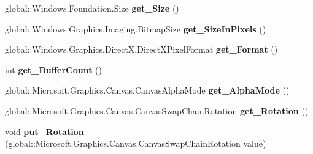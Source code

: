 \begin{DoxyCompactItemize}
global\+::\+Windows.\+Foundation.\+Size {\bfseries get\+\_\+\+Size} ()
\item 
\mbox{\label{interface_microsoft_1_1_graphics_1_1_canvas_1_1_i_canvas_swap_chain_a3d6681ade03b642ae899d612f2725a9a}} 
global\+::\+Windows.\+Graphics.\+Imaging.\+Bitmap\+Size {\bfseries get\+\_\+\+Size\+In\+Pixels} ()
\item 
\mbox{\label{interface_microsoft_1_1_graphics_1_1_canvas_1_1_i_canvas_swap_chain_a6fb78df6d196feac81f54bcbb0f8dfa4}} 
global\+::\+Windows.\+Graphics.\+Direct\+X.\+Direct\+X\+Pixel\+Format {\bfseries get\+\_\+\+Format} ()
\item 
\mbox{\label{interface_microsoft_1_1_graphics_1_1_canvas_1_1_i_canvas_swap_chain_a33e552e317fa0af44a3768d918cfc3b1}} 
int {\bfseries get\+\_\+\+Buffer\+Count} ()
\item 
\mbox{\label{interface_microsoft_1_1_graphics_1_1_canvas_1_1_i_canvas_swap_chain_aec4483702807638006acc34e237b1e23}} 
global\+::\+Microsoft.\+Graphics.\+Canvas.\+Canvas\+Alpha\+Mode {\bfseries get\+\_\+\+Alpha\+Mode} ()
\item 
\mbox{\label{interface_microsoft_1_1_graphics_1_1_canvas_1_1_i_canvas_swap_chain_a8e56717493f8cd2abe583fe0b23dbc81}} 
global\+::\+Microsoft.\+Graphics.\+Canvas.\+Canvas\+Swap\+Chain\+Rotation {\bfseries get\+\_\+\+Rotation} ()
\item 
\mbox{\label{interface_microsoft_1_1_graphics_1_1_canvas_1_1_i_canvas_swap_chain_a931e117cf8d541e0154abccf052807fb}} 
void {\bfseries put\+\_\+\+Rotation} (global\+::\+Microsoft.\+Graphics.\+Canvas.\+Canvas\+Swap\+Chain\+Rotation value)
\item 
\mbox{\label{interface_microsoft_1_1_graphics_1_1_canvas_1_1_i_canvas_swap_chain_ae2841a44387495cf2aecbadd50cae216}} 

\end{DoxyCompactItemize}
